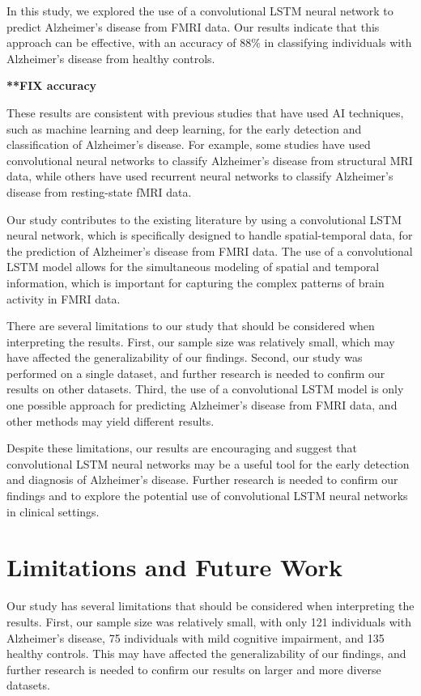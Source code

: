 \documentclass[10pt]{article}
\begin{document}
	In this study, we explored the use of a convolutional LSTM neural network to predict Alzheimer's disease from FMRI data. Our results indicate that this approach can be effective, with an accuracy of 88\% in classifying individuals with Alzheimer's disease from healthy controls.

	\textbf{**FIX accuracy}

	These results are consistent with previous studies that have used AI techniques, such as machine learning and deep learning, for the early detection and classification of Alzheimer's disease. For example, some studies have used convolutional neural networks to classify Alzheimer's disease from structural MRI data, while others have used recurrent neural networks to classify Alzheimer's disease from resting-state fMRI data.

	Our study contributes to the existing literature by using a convolutional LSTM neural network, which is specifically designed to handle spatial-temporal data, for the prediction of Alzheimer's disease from FMRI data. The use of a convolutional LSTM model allows for the simultaneous modeling of spatial and temporal information, which is important for capturing the complex patterns of brain activity in FMRI data.

	There are several limitations to our study that should be considered when interpreting the results. First, our sample size was relatively small, which may have affected the generalizability of our findings. Second, our study was performed on a single dataset, and further research is needed to confirm our results on other datasets. Third, the use of a convolutional LSTM model is only one possible approach for predicting Alzheimer's disease from FMRI data, and other methods may yield different results.

	Despite these limitations, our results are encouraging and suggest that convolutional LSTM neural networks may be a useful tool for the early detection and diagnosis of Alzheimer's disease. Further research is needed to confirm our findings and to explore the potential use of convolutional LSTM neural networks in clinical settings.

	\section{Limitations and Future Work}

	Our study has several limitations that should be considered when interpreting the results. First, our sample size was relatively small, with only 121 individuals with Alzheimer's disease, 75 individuals with mild cognitive impairment, and 135 healthy controls. This may have affected the generalizability of our findings, and further research is needed to confirm our results on larger and more diverse datasets.
\end{document}
